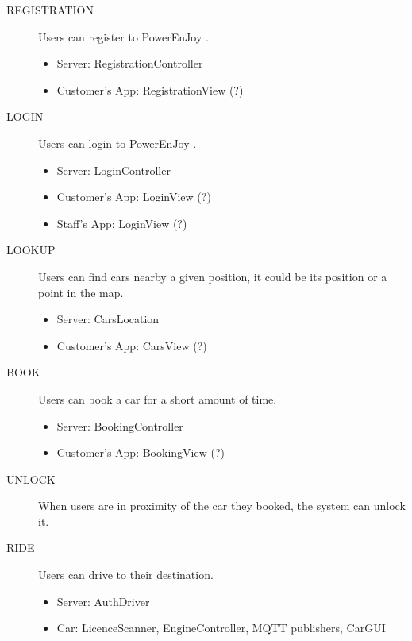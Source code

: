 \documentclass[11pt]{article} %
\newcommand{\pe}{PowerEnJoy }
\begin{document}
 \begin{description}
 	\item[REGISTRATION] Users can register to \pe.
	\begin{itemize}
		\item Server: RegistrationController
		\item Customer's App: RegistrationView (?)
	\end{itemize}

	\item[LOGIN] Users can login to \pe.
	\begin{itemize}
		\item Server: LoginController
		\item Customer's App: LoginView (?)
		\item Staff's App: LoginView (?)
	\end{itemize}

 	\item[LOOKUP] Users can find cars nearby a given position, it could be its position or a point in the map.
	\begin{itemize}
		\item Server: CarsLocation
		\item Customer's App: CarsView (?)
	\end{itemize}

 	\item[BOOK] Users can book a car for a short amount of time.
	\begin{itemize}
		\item Server: BookingController
		\item Customer's App: BookingView (?)
	\end{itemize}

 	\item[UNLOCK] When users are in proximity of the car they booked, the system can unlock it.

	\item[RIDE] Users can drive to their destination.
	\begin{itemize}
		\item Server: AuthDriver
		\item Car: LicenceScanner, EngineController, MQTT publishers, CarGUI
	\end{itemize}


\end{description}
\end{document}
